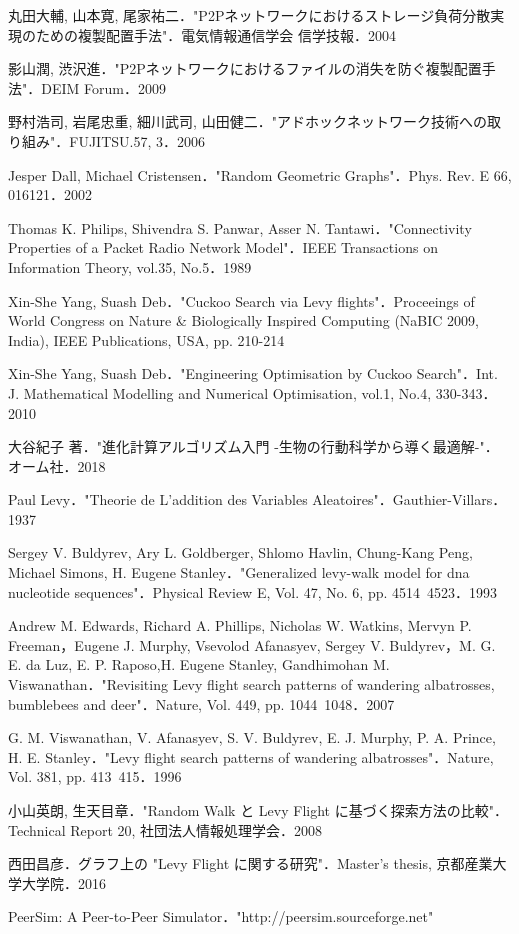 \documentclass[11pt]{jreport}
\begin{document}
\begin{thebibliography}{99}

丸田大輔, 山本寛, 尾家祐二．"P2Pネットワークにおけるストレージ負荷分散実現のための複製配置手法"．電気情報通信学会 信学技報．2004

影山潤, 渋沢進．"P2Pネットワークにおけるファイルの消失を防ぐ複製配置手法"．DEIM Forum．2009

野村浩司, 岩尾忠重, 細川武司, 山田健二．"アドホックネットワーク技術への取り組み"．FUJITSU.57, 3．2006

Jesper Dall, Michael Cristensen．"Random Geometric Graphs"．Phys. Rev. E 66, 016121．2002

Thomas K. Philips, Shivendra S. Panwar, Asser N. Tantawi．"Connectivity Properties of a Packet Radio Network Model"．IEEE Transactions on Information Theory, vol.35, No.5．1989

Xin-She Yang, Suash Deb．"Cuckoo Search via Levy flights"．Proceeings of World Congress on Nature \& Biologically Inspired Computing (NaBIC 2009, India), IEEE Publications, USA, pp. 210-214

Xin-She Yang, Suash Deb．"Engineering Optimisation by Cuckoo Search"．Int. J. Mathematical Modelling and Numerical Optimisation, vol.1,  No.4, 330-343．2010

大谷紀子 著．"進化計算アルゴリズム入門 -生物の行動科学から導く最適解-"．オーム社．2018

Paul Levy．"Theorie de L’addition des Variables Aleatoires"．Gauthier-Villars．1937

Sergey V. Buldyrev, Ary L. Goldberger, Shlomo Havlin, Chung-Kang Peng, Michael Simons, H. Eugene Stanley．"Generalized levy-walk model for dna nucleotide sequences"．Physical Review E, Vol. 47, No. 6, pp. 4514~4523．1993

Andrew M. Edwards, Richard A. Phillips, Nicholas W. Watkins, Mervyn P. Freeman，Eugene J. Murphy, Vsevolod Afanasyev, Sergey V. Buldyrev，M. G. E. da Luz, E. P. Raposo,H. Eugene Stanley, Gandhimohan M. Viswanathan．"Revisiting Levy flight search patterns of wandering albatrosses, bumblebees and deer"．Nature, Vol. 449, pp. 1044~1048．2007

G. M. Viswanathan, V. Afanasyev, S. V. Buldyrev, E. J. Murphy, P. A. Prince, H. E. Stanley．"Levy flight search patterns of wandering albatrosses"．Nature, Vol. 381, pp. 413~415．1996

小山英朗, 生天目章．"Random Walk と Levy Flight に基づく探索方法の比較"． Technical Report 20, 社団法人情報処理学会．2008

西田昌彦．グラフ上の "Levy Flight に関する研究"．Master’s thesis, 京都産業大学大学院．2016

PeerSim: A Peer-to-Peer Simulator．"http://peersim.sourceforge.net"

\end{thebibliography}
\end{document}
